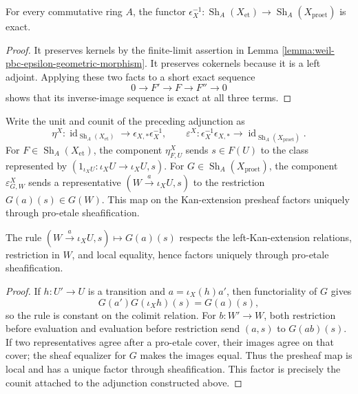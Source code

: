 \begin{lemma}
\label{lemma:weil-pbc-epsilon-inverse-image-exact}
\uses{}

For every commutative ring $A$, the functor
$\epsilon_X^{-1}:\operatorname{Sh}_A(X_{\mathrm{et}})\to
\operatorname{Sh}_A(X_{\mathrm{proet}})$ is exact.
\end{lemma}
\begin{proof}

It preserves kernels by the finite-limit assertion in
Lemma \ref{lemma:weil-pbc-epsilon-geometric-morphism}.  It preserves
cokernels because it is a left adjoint.  Applying these two facts to a short
exact sequence
\[
 0\longrightarrow F'\longrightarrow F\longrightarrow F''\longrightarrow0
\]
shows that its inverse-image sequence is exact at all three terms.
\end{proof}

\begin{definition}
\label{def:weil-pbc-epsilon-unit-counit}
Write the unit and counit of the preceding adjunction as
\[
 \eta^X:\operatorname{id}_{\operatorname{Sh}_A(X_{\mathrm{et}})}
  \longrightarrow\epsilon_{X,*}\epsilon_X^{-1},
 \qquad
 \varepsilon^X:\epsilon_X^{-1}\epsilon_{X,*}
  \longrightarrow\operatorname{id}_{\operatorname{Sh}_A(X_{\mathrm{proet}})}.
\]
For $F\in\operatorname{Sh}_A(X_{\mathrm{et}})$, the component
$\eta^X_{F,U}$ sends $s\in F(U)$ to the class represented by
$(1_{\iota_XU}:\iota_XU\to\iota_XU,s)$.  For
$G\in\operatorname{Sh}_A(X_{\mathrm{proet}})$, the component
$\varepsilon^X_{G,W}$ sends a representative
$(W\xrightarrow{a}\iota_XU,s)$ to the restriction $G(a)(s)\in G(W)$.
This map on the Kan-extension presheaf factors uniquely through pro-etale
sheafification.
\end{definition}


\begin{lemma}
\label{lemma:weil-pbc-epsilon-counit-representative-descent-v1}
The rule $(W\xrightarrow a\iota_XU,s)\mapsto G(a)(s)$ respects the
left-Kan-extension relations, restriction in $W$, and local equality, hence
factors uniquely through pro-etale sheafification.
\end{lemma}
\begin{proof}
If $h:U'\to U$ is a transition and $a=\iota_X(h)a'$, then
functoriality of $G$ gives
\[
 G(a')G(\iota_Xh)(s)=G(a)(s),
\]
so the rule is constant on the colimit relation.  For $b:W'\to W$, both
restriction before evaluation and evaluation before restriction send
$(a,s)$ to $G(ab)(s)$.  If two representatives agree after a pro-etale
cover, their images agree on that cover; the sheaf equalizer for $G$ makes
the images equal.  Thus the presheaf map is local and has a unique factor
through sheafification.  This factor is precisely the counit attached to the
adjunction constructed above.
\end{proof}

